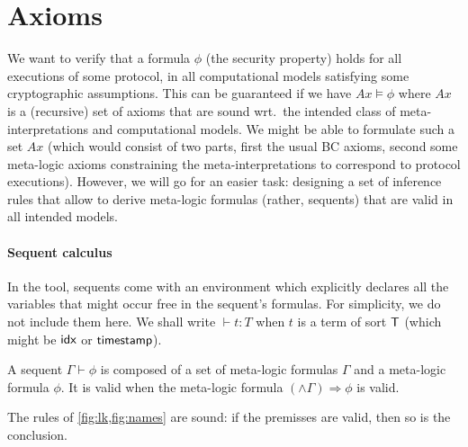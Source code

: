 \section{Axioms}

We want to verify that a formula $\phi$ (the security property)
holds for all executions of some protocol, in all computational models
satisfying some cryptographic assumptions.
This can be guaranteed if we have $Ax\models\phi$
where $Ax$ is a (recursive) set of axioms that are sound
wrt.\ the intended class of meta-interpretations and computational models.
We might be able to formulate such a set $Ax$ (which would consist of
two parts, first the usual BC axioms, second some meta-logic axioms
constraining the meta-interpretations to correspond to protocol executions).
However, we will go for an easier task: designing a set of inference
rules that allow to derive meta-logic formulas (rather, sequents)
that are valid in all intended models.

\paragraph{Sequent calculus}

In the tool, sequents come with an environment which explicitly
declares all the variables that might occur free in the sequent's formulas.
For simplicity, we do not include them here. We shall write $\vdash t:T$
when $t$ is a term of sort $\textsf{T}$ (which might be $\textsf{idx}$ or $\textsf{timestamp}$).

\begin{definition}
  A sequent $\Gamma \vdash \phi$ is composed of a set of meta-logic formulas
  $\Gamma$ and a meta-logic formula $\phi$.
  It is valid when the meta-logic formula
  $(\wedge\Gamma) \Rightarrow \phi$ is valid.
\end{definition}

\begin{proposition}
  The rules of \cref{fig:lk,fig:names} are sound: if the premisses are valid,
  then so is the conclusion.
\end{proposition}

